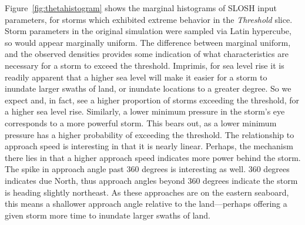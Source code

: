 Figure~\ref{fig:thetahistogram} shows the marginal histograms of SLOSH input 
    parameters, for storms which exhibited extreme behavior in the \emph{Threshold} 
    slice.  Storm parameters in the original simulation were sampled via Latin 
    hypercube, so would appear marginally uniform.  The difference between marginal 
    uniform, and the observed densities provides some indication of what 
    characteristics are necessary for a storm to exceed the threshold.
    Imprimis, for sea level rise it is readily apparent that a higher sea level will
    make it easier for a storm to inundate larger swaths of land, or inundate locations to a
    greater degree.  So we expect and, in fact, see a higher proportion of storms exceeding
    the threshold, for a higher sea level rise.  Similarly, a lower minimum pressure in the storm's
    eye corresponds to a more powerful storm.  This bears out, as a lower minimum pressure has
    a higher probability of exceeding the threshold.  The relationship to approach speed is 
    interesting in that it is nearly linear.  Perhaps, the mechanism there lies in that a higher
    approach speed indicates more power behind the storm.  The spike in approach angle past 360
    degrees is interesting as well. 360 degrees indicates due North, thus approach angles 
    beyond 360 degrees indicate the storm is heading slightly northeast. As these approaches are
    on the eastern seaboard, this means a shallower approach angle relative to the
    land---perhaps offering a given storm more time to inundate larger swaths of land.

